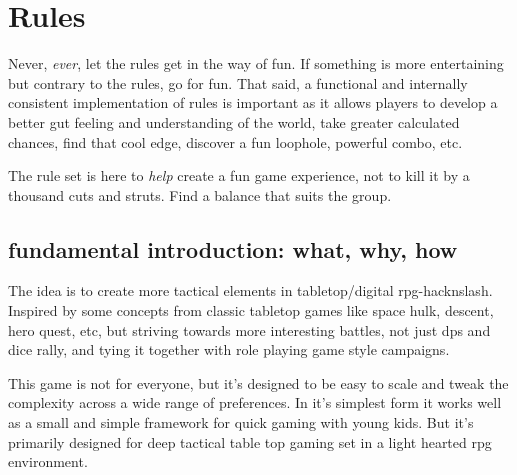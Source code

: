 

%
%


\cleardoublepage



\chapter*{Rules}

Never, \emph{ever}, let the rules get in the way of fun. If something is more entertaining but contrary to the rules, go for fun. That said, a functional and internally consistent implementation of rules is important as it allows players to develop a better gut feeling and understanding of the world, take greater calculated chances, find that cool edge, discover a fun loophole, powerful combo, etc.

The rule set is here to \emph{help} create a fun game experience, not to kill it by a thousand cuts and struts. Find a balance that suits the group. 


\section*{fundamental introduction: what, why, how}

The idea is to create more tactical elements in tabletop/digital rpg-hacknslash. Inspired by some concepts from classic tabletop games like space hulk, descent, hero quest, etc, but striving towards more interesting battles, not just dps and dice rally, and tying it together with role playing game style campaigns.

This game is not for everyone, but it's designed to be easy to scale and tweak the complexity across a wide range of preferences. In it's simplest form it works well as a small and simple framework for quick gaming with young kids. But it's primarily designed for deep tactical table top gaming set in a light hearted rpg environment.

